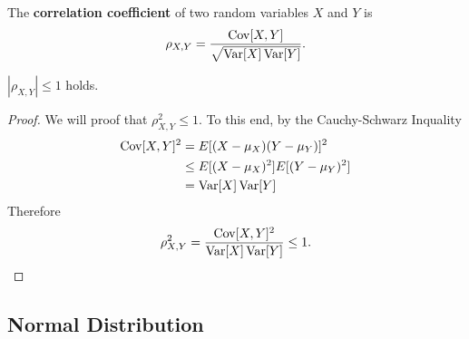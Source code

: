 \documentclass{memoir}
\begin{document}
\begin{definition}
    The \textbf{correlation coefficient} of two random variables $X$ and $Y$ is
    \begin{align*}
        \rho_{X,Y} = \frac{\operatorname{Cov}[X,Y]}{\sqrt{\operatorname{Var}[X]\operatorname{Var}[Y]}}.
    \end{align*}
\end{definition}

\begin{theorem}
    $|\rho_{X,Y}|\le1$ holds.
\end{theorem}
\begin{proof}
    We will proof that $\rho_{X,Y}^2 \le 1$. To this end, by the Cauchy-Schwarz Inquality
    \begin{align*}
        \operatorname{Cov}[X,Y]^2 &= E[(X- \mu_X)(Y- \mu_Y)]^2 \\
        &\le E[(X-\mu_X)^2] E[(Y- \mu_Y)^2] \\
        &= \operatorname{Var}[X] \operatorname{Var}[Y]
    \end{align*}
    Therefore
    \begin{align*}
        \rho_{X,Y}^2 = \frac{\operatorname{Cov}[X,Y]^2}{\operatorname{Var}[X]\operatorname{Var}[Y]} \le 1.
    \end{align*}
\end{proof}

\subsection{Normal Distribution}
\end{document}

